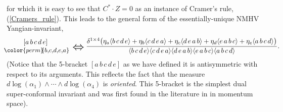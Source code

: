 \documentclass[12pt,hyperref,compress]{JHEP3}
\newcommand{\eq}[1]{\begin{equation}#1\end{equation}}
\newcommand{\ab}[1]{\langle #1 \rangle}
\begin{document}
{for which it is easy to see that $C^*\!\!\cdot\!Z=0$ as an instance of Cramer's rule, (\ref{Cramers_rule}). This leads to the general form of the essentially-unique NMHV Yangian-invariant,
\vspace{-.2cm}\eq{\hspace{-0.35cm}\begin{array}{c}[a\,b\,c\,d\,e]\\\text{{\small${\color{perm}\!\!\{b,\!c,\!d,\!e,\!a\}}\!\!$}}\end{array}\raisebox{-3pt}{\text{{\LARGE$\,\Leftrightarrow\,$}}}\frac{\delta^{1\times4}\big(\eta_a\ab{b\,c\,d\,e}+\eta_b\ab{c\,d\,e\,a}+\eta_c\ab{d\,e\,a\,b}+\eta_d\ab{e\,a\,b\,c}+\eta_e\ab{a\,b\,c\,d}\big)}{\ab{b\,c\,d\,e}\ab{c\,d\,e\,a}\ab{d\,e\,a\,b}\ab{e\,a\,b\,c}\ab{a\,b\,c\,d}}.\label{5bracket_not_consecutive}\hspace{-1cm}\vspace{-.2cm}}
(Notice that the 5-bracket $[a\,b\,c\,d\,e]$ as we have defined it is antisymmetric with respect to its arguments. This reflects the fact that the measure \mbox{$d\!\log(\alpha_1)\wedge\cdots\wedge d\!\log(\alpha_4)$} is {\it oriented}. This 5-bracket is the simplest dual super-conformal invariant and was first found in the literature in \cite{Drummond:2008vq} in momentum space).

}
\end{document}
